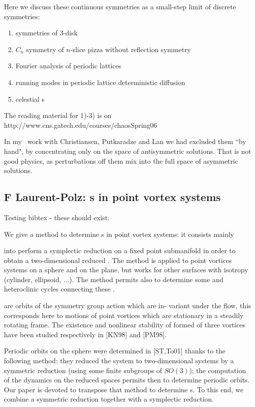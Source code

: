         Here we discuss these continuous symmetries as
a small-step limit of discrete symmetries:

\begin{enumerate}
\item
        symmetries of 3-disk
\item
        $C_n$ symmetry of $n$-slice pizza without reflection symmetry
\item
        Fourier analysis of periodic lattices
\item
        running modes in periodic lattice deterministic
           diffusion
\item
    celestial {\rpo s}
\end{enumerate}

The reading material for 1)-3) is on
http://www.cns.gatech.edu/courses/chaosSpring06

In my \KS\ work with Christiansen, Putkaradze and Lan we
had excluded them ``by hand", by concentrating only on the space of
antisymmetric solutions. That is not good physics, as perturbations off
them mix into the full space of asymmetric solutions.

\subsection{F Laurent-Polz: {\Rpo s} in point vortex systems}

Testing bibtex - these should exist:

We give a method to determine {\rpo s} in point vortex systems: it consists mainly 

into perform a symplectic reduction on a fixed point submanifold in order to obtain 
a two-dimensional reduced \statesp. The method is applied to point vortices systems 
on a sphere and on the plane, but works for other surfaces with isotropy 
(cylinder, ellipsoid, ...). The method permits also to determine some 
{\reqva} and heteroclinic cycles connecting these {\reqva}.

    {\Reqva} are orbits of the symmetry group action which are in-
variant under the flow, this corresponds here to motions of point vortices which
are stationary in a steadily rotating frame.
 The existence and nonlinear stability
of {\reqva} formed of three vortices have been studied respectively in
[KN98] and [PM98]. 

Periodic orbits on the sphere were determined in [ST,To01] thanks to the
following method: they reduced the system to two-dimensional systems by a
symmetric reduction (using some finite subgroups of $SO(3)$); the computation
of the dynamics on the reduced spaces permits then to determine periodic orbits.
Our paper is devoted to transpose that method to determine {\rpo s}. 
To this end, we combine a symmetric reduction together with a symplectic reduction. 

